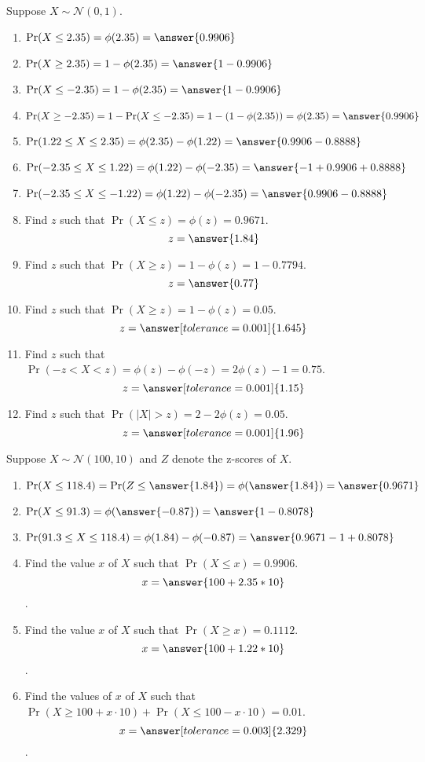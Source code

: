 \documentclass{ximera}
\begin{document}
\begin{problem}
Suppose $X\sim \mathcal N(0,1).$ 
\begin{enumerate}
\item $\Pr(X\leq 2.35)=\phi(2.35)=\answer{0.9906}$
\item $\Pr(X\geq 2.35)=1-\phi(2.35)=\answer{1-0.9906}$
\item $\Pr(X\leq -2.35)=1-\phi(2.35)=\answer{1-0.9906}$
\item $\Pr(X\geq -2.35)=1-\Pr(X\leq -2.35)=1-(1-\phi(2.35))=\phi(2.35)=\answer{0.9906}$
\item $\Pr(1.22\leq X\leq 2.35)=\phi(2.35)-\phi(1.22)=\answer{0.9906-0.8888}$
\item $\Pr(-2.35\leq X\leq 1.22)=\phi(1.22)-\phi(-2.35)=\answer{-1+0.9906+0.8888}$
\item $\Pr(-2.35\leq X\leq -1.22)=\phi(1.22)-\phi(-2.35)=\answer{0.9906-0.8888}$
\item Find $z$ such that $\Pr(X\leq z)=\phi(z)={0.9671}$.
$$z=\answer{1.84}$$
\item Find $z$ such that $\Pr(X\geq z)=1-\phi(z)={1-0.7794}$.
$$z=\answer{0.77}$$
\item Find $z$ such that $\Pr(X\geq z)=1-\phi(z)={0.05}$.
$$z=\answer[tolerance=0.001]{1.645}$$
\item Find $z$ such that $\Pr(-z<X< z)=\phi(z)-\phi(-z)=2\phi(z)-1={0.75}$.
$$z=\answer[tolerance=0.001]{1.15}$$
\item Find $z$ such that $\Pr(|X|> z)=2-2\phi(z)={0.05}$.
$$z=\answer[tolerance=0.001]{1.96}$$

\end{enumerate}
\end{problem}

\begin{problem}
Suppose $X\sim \mathcal N(100,10)$ and $Z$ denote the z-scores of $X$. 
\begin{enumerate}
\item $\Pr(X\leq 118.4)=\Pr(Z\leq \answer{1.84})=\phi(\answer{1.84})=\answer{0.9671}$
\item $\Pr(X\leq 91.3)=\phi(\answer{-0.87})=\answer{1-0.8078}$
\item $\Pr(91.3\leq X\leq 118.4)=\phi(1.84)-\phi(-0.87)=\answer{0.9671-1+0.8078}$
\item Find the value $x$ of $X$ such that $\Pr(X\leq x)=0.9906$.
$$x=\answer{100+2.35*10}$$.
\item Find the value $x$ of $X$ such that $\Pr(X\geq x)=0.1112$.
$$x=\answer{100+1.22*10}$$.
\item Find the values of $x$ of $X$ such that $\Pr(X\geq 100+x\cdot 10)+\Pr(X\leq 100-x\cdot 10)=0.01$.
$$x=\answer[tolerance=0.003]{2.329}$$.
\end{enumerate}
\end{problem}
\end{document}
